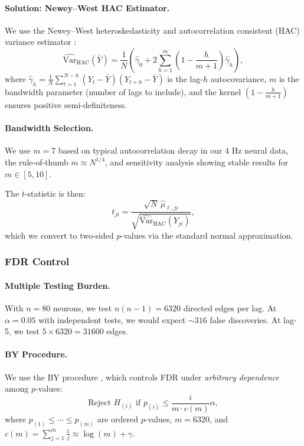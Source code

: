\documentclass{article}
\theoremstyle{plain}
\theoremstyle{definition}
\theoremstyle{remark}
\newcommand{\1}{\mathbf{1}}
\begin{document}
\paragraph{Solution: Newey--West HAC Estimator.}
We use the Newey--West heteroskedasticity and autocorrelation consistent (HAC) variance estimator \citep{NeweyWest1987}:
\begin{equation}
\widehat{\mathrm{Var}}_{\mathrm{HAC}}(\bar{Y}) = \frac{1}{N}\left(\widehat{\gamma}_0 + 2\sum_{h=1}^m \left(1 - \frac{h}{m+1}\right) \widehat{\gamma}_h\right),
\label{eq:hac_var}
\end{equation}
where $\widehat{\gamma}_h = \frac{1}{N} \sum_{t=1}^{N-h} (Y_t - \bar{Y})(Y_{t+h} - \bar{Y})$ is the lag-$h$ autocovariance, $m$ is the bandwidth parameter (number of lags to include), and the kernel $\left(1 - \frac{h}{m+1}\right)$ ensures positive semi-definiteness.

\paragraph{Bandwidth Selection.}
We use $m = 7$ based on typical autocorrelation decay in our 4 Hz neural data, the rule-of-thumb $m \approx N^{1/4}$, and sensitivity analysis showing stable results for $m \in [5, 10]$.

The $t$-statistic is then:
\begin{equation}
t_{ji} = \frac{\sqrt{N} \, \widehat{\mu}_{\ell,ji}}{\sqrt{\widehat{\mathrm{Var}}_{\mathrm{HAC}}(Y_{ji})}},
\end{equation}
which we convert to two-sided $p$-values via the standard normal approximation.

\subsubsection{FDR Control}

\paragraph{Multiple Testing Burden.}
With $n = 80$ neurons, we test $n(n-1) = 6320$ directed edges per lag. At $\alpha = 0.05$ with independent tests, we would expect $\sim 316$ false discoveries. At lag-5, we test $5 \times 6320 = 31600$ edges.

\paragraph{BY Procedure.}
We use the BY procedure \citep{BenjaminiYekutieli2001}, which controls FDR under \emph{arbitrary dependence} among $p$-values:
\begin{equation}
\text{Reject } H_{(i)} \text{ if } p_{(i)} \leq \frac{i}{m \cdot c(m)} \alpha,
\end{equation}
where $p_{(1)} \leq \cdots \leq p_{(m)}$ are ordered $p$-values, $m = 6320$, and $c(m) = \sum_{j=1}^m \frac{1}{j} \approx \log(m) + \gamma$.
\end{document}
